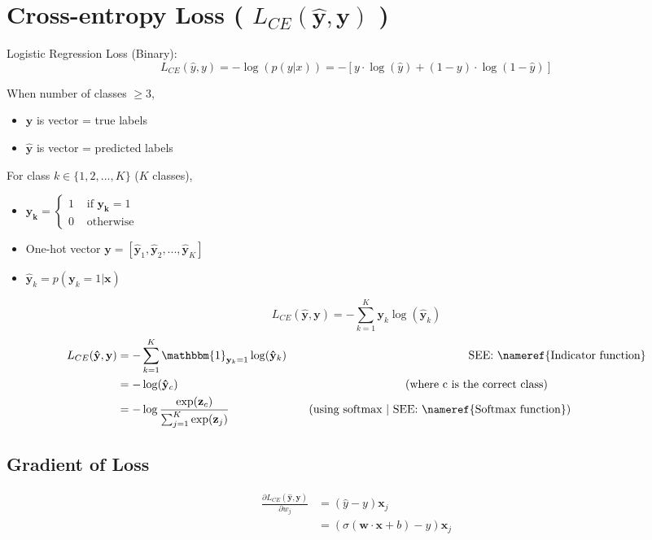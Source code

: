 \section{Cross-entropy Loss ( $L_{CE}(\hat{\mathbf{y}},\mathbf{y})$ ) \cite{nlp-1}}

Logistic Regression Loss (Binary):
\[
    L_{CE}(\hat{y}, y) = -\log(p(y|x)) = -[y\cdot\log(\hat{y})+ (1-y)\cdot\log(1-\hat{y})]
\]

When number of classes $\geq 3$,
\begin{itemize}
    \item $\mathbf{y}$ is vector = true labels
    \item $\mathbf{\hat{y}}$ is vector = predicted labels
\end{itemize}

\vspace{0.3cm}
For class $k \in \{1,2,...,K\}$ ($K$ classes),
\begin{itemize}
    \item \(\mathbf{y_k} = \begin{cases}
        1 & \text{ if } \mathbf{y_k} = 1 \\
        0 & \text{ otherwise}
    \end{cases}\)
    \item One-hot vector $\mathbf{y} = [\mathbf{\hat{y}}_1, \mathbf{\hat{y}}_2, ..., \mathbf{\hat{y}}_K]$
    \item $\mathbf{\hat{y}}_k = p(\mathbf{y}_k = 1|\mathbf{x})$
\end{itemize}

\vspace{0.2cm}
\[
    L_{CE}(\mathbf{\hat{y}}, \mathbf{y}) = -\sum_{k=1}^{K} \mathbf{y}_k\log(\mathbf{\hat{y}}_k)
\]
\begin{align}
    L_{CE}(\mathbf{\hat{y}}, \mathbf{y}) &= -\sum_{k=1}^{K} \mathbbm{1}_{\mathbf{y}_k =1}\log(\mathbf{\hat{y}}_k) \notag
    \repeatn{16}{\quad} \text{SEE: \nameref{Indicator function}}\\
    &= -\log(\mathbf{\hat{y}}_c)\notag \repeatn{20}{\quad} \text{(where c is the correct class)}\\
    &= -\log\displaystyle\frac{\exp(\mathbf{z}_c)}{\sum_{j=1}^{K} \exp(\mathbf{z}_j)} \notag \repeatn{7}{\quad} \text{(using softmax | SEE: \nameref{Softmax function})}
\end{align}


\subsection{Gradient of Loss}
\begin{align}
    \frac{\partial L_{CE}(\mathbf{\hat{y}}, \mathbf{y})}{\partial w_j} &= (\hat{y} - y) \mathbf{x}_j \\
    &= (\sigma(\mathbf{w} \cdot \mathbf{x} + b) - y) \mathbf{x}_j
\end{align}

